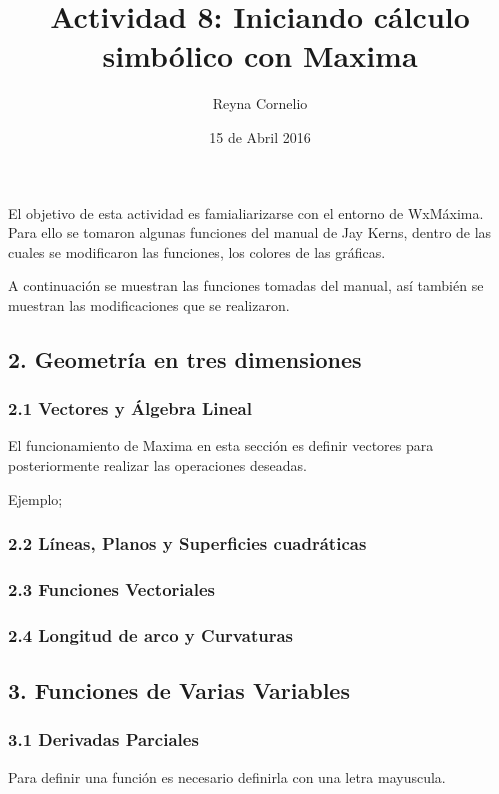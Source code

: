 \documentclass[12pt]{article}
\begin{document}
\title{Actividad 8: 
Iniciando cálculo simbólico con Maxima}
\author{Reyna Cornelio}
\date{15 de Abril 2016}
\maketitle

El objetivo  de esta actividad es famialiarizarse con el entorno de WxMáxima.
Para ello se tomaron algunas funciones del manual de Jay Kerns, dentro de las cuales se modificaron las funciones, los colores de las gráficas.

A continuación se muestran las funciones tomadas del manual, así también se muestran las modificaciones que se realizaron.


\subsection*{2. Geometría en tres dimensiones}
\subsubsection*{2.1 Vectores y Álgebra Lineal}
El funcionamiento de Maxima en esta sección es definir vectores para posteriormente realizar las operaciones deseadas.

Ejemplo;

\subsubsection*{2.2 Líneas, Planos y Superficies cuadráticas}


\subsubsection*{2.3 Funciones Vectoriales}

\subsubsection*{2.4 Longitud de arco y Curvaturas}

\subsection*{3. Funciones de Varias Variables}
\subsubsection*{3.1 Derivadas Parciales}

Para definir una función es necesario definirla con una letra mayuscula.
\noindent
\end{document}
